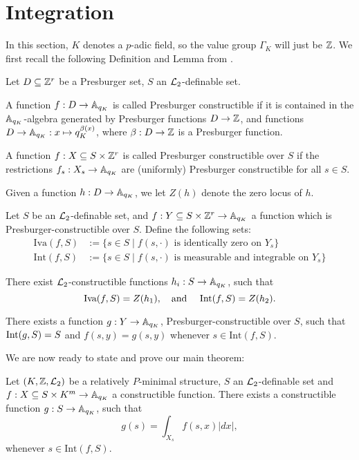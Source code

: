 \section{Integration}
In this section, $K$ denotes a $p$-adic field, so the value group $\Gamma_K$ will just be $\Z$.
We first recall the following Definition and Lemma from \cite{Clu-Gor-Hal-14}.
\begin{defn}Let $D \subseteq \ZZ^r$ be a Presburger set, $S$ an $\Lm_2$-definable set.
\item A function $f: D \to \AA_{q_K}$ is called Presburger constructible if it is contained in the $\AA_{q_K}$-algebra generated by Presburger functions $D\to \ZZ$, and functions $D\to \AA_{q_K}: x \mapsto q_K^{\beta(x)}$, where $\beta:D \to \ZZ$ is a Presburger function.
\item A function $f:X\subseteq S \times \ZZ^r$ is called Presburger constructible over $S$ if  the restrictions $f_s: X_s \to \AA_{q_K}$ are (uniformly) Presburger constructible for all $s \in S$. 
\item Given a function $h:D\to \AA_{q_K}$, we let $Z(h)$ denote the zero locus of $h$.
\end{defn}
\begin{def-lem}\label{lemma:presburgerloci} Let $S$ be an $\Lm_2$-definable set, 
and $f:Y\subseteq S\times \ZZ^r\to \AA_{q_K}$ a function which is Presburger-constructible over $S$. Define the following sets:
\begin{align*}
\text{Iva}(f,S)&:=\{s \in S \mid f(s, \cdot) \text{ is identically zero on } Y_s\}\\
\text{Int}(f,S) &:=\{s \in S \mid f(s, \cdot) \text{ is measurable and integrable on } Y_s \}
\end{align*}
\item There exist $\Lm_2$-constructible functions $h_i: S \to \AA_{q_K}$, such that 
\[\text{Iva}(f,S) = Z(h_1), \text{\quad and \quad }
\text{Int}(f,S) = Z(h_2).\]
\item There exists a function $g: Y \to \AA_{q_K}$, Presburger-constructible over $S$, such that $\Int(g,S) = S$ and $f(s,y) = g(s,y)$ whenever $s \in \text{Int}(f,S)$.
\end{def-lem}
We are now ready to state and prove our main theorem:
\begin{thm}
Let $(K, \Z, \Lm_2)$ be a relatively $P$-minimal structure, $S$ an $\Lm_2$-definable set and $f: X \subseteq S\times K^m \to \AA_{q_K}$ a constructible function.  There exists a constructible function $g: S \to \AA_{q_K}$, such that
\[g(s) = \int_{X_s} f(s,x)|dx|,\]
whenever $s \in \text{Int}(f,S)$.
\end{thm}

